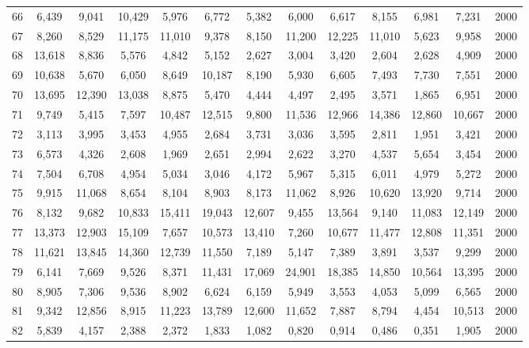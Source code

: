 {\begin{longtable}{ >{\footnotesize}ccccccccccccc}
66  & 6,439  & 9,041  & 10,429 & 5,976  & 6,772  & 5,382  & 6,000  & 6,617  & 8,155  & 6,981  & 7,231  & 2000 \\
67  & 8,260  & 8,529  & 11,175 & 11,010 & 9,378  & 8,150  & 11,200 & 12,225 & 11,010 & 5,623  & 9,958  & 2000 \\
68  & 13,618 & 8,836  & 5,576  & 4,842  & 5,152  & 2,627  & 3,004  & 3,420  & 2,604  & 2,628  & 4,909  & 2000 \\
69  & 10,638 & 5,670  & 6,050  & 8,649  & 10,187 & 8,190  & 5,930  & 6,605  & 7,493  & 7,730  & 7,551  & 2000 \\
70  & 13,695 & 12,390 & 13,038 & 8,875  & 5,470  & 4,444  & 4,497  & 2,495  & 3,571  & 1,865  & 6,951  & 2000 \\
71  & 9,749  & 5,415  & 7,597  & 10,487 & 12,515 & 9,800  & 11,536 & 12,966 & 14,386 & 12,860 & 10,667 & 2000 \\
72  & 3,113  & 3,995  & 3,453  & 4,955  & 2,684  & 3,731  & 3,036  & 3,595  & 2,811  & 1,951  & 3,421  & 2000 \\
73  & 6,573  & 4,326  & 2,608  & 1,969  & 2,651  & 2,994  & 2,622  & 3,270  & 4,537  & 5,654  & 3,454  & 2000 \\
74  & 7,504  & 6,708  & 4,954  & 5,034  & 3,046  & 4,172  & 5,967  & 5,315  & 6,011  & 4,979  & 5,272  & 2000 \\
75  & 9,915  & 11,068 & 8,654  & 8,104  & 8,903  & 8,173  & 11,062 & 8,926  & 10,620 & 13,920 & 9,714  & 2000 \\
76  & 8,132  & 9,682  & 10,833 & 15,411 & 19,043 & 12,607 & 9,455  & 13,564 & 9,140  & 11,083 & 12,149 & 2000 \\
77  & 13,373 & 12,903 & 15,109 & 7,657  & 10,573 & 13,410 & 7,260  & 10,677 & 11,477 & 12,808 & 11,351 & 2000 \\
78  & 11,621 & 13,845 & 14,360 & 12,739 & 11,550 & 7,189  & 5,147  & 7,389  & 3,891  & 3,537  & 9,299  & 2000 \\
79  & 6,141  & 7,669  & 9,526  & 8,371  & 11,431 & 17,069 & 24,901 & 18,385 & 14,850 & 10,564 & 13,395 & 2000 \\
80  & 8,905  & 7,306  & 9,536  & 8,902  & 6,624  & 6,159  & 5,949  & 3,553  & 4,053  & 5,099  & 6,565  & 2000 \\
81  & 9,342  & 12,856 & 8,915  & 11,223 & 13,789 & 12,600 & 11,652 & 7,887  & 8,794  & 4,454  & 10,513 & 2000 \\
82  & 5,839  & 4,157  & 2,388  & 2,372  & 1,833  & 1,082  & 0,820  & 0,914  & 0,486  & 0,351  & 1,905  & 2000 \\

\end{longtable}}
